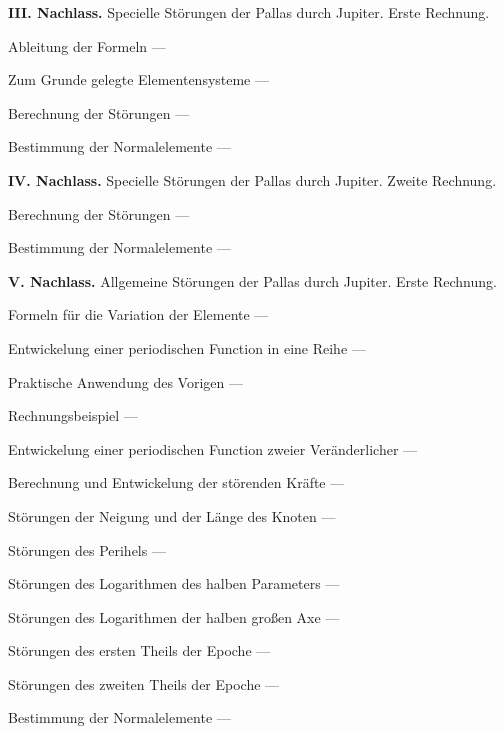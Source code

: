 \documentclass[10pt,a4paper]{article}
\newenvironment{hangparas}[2]{\setlength{\hangindent}{#1}\setlength{\hangafter}{#2}}{}
\begin{document}
\vspace{0.5em}

\begin{hangparas}{1em}{1}
\noindent\textbf{III. Nachlass.} Specielle Störungen der Pallas durch Jupiter. Erste Rechnung.

\vspace{0.2em}

\noindent\quad Ableitung der Formeln \hfill ---

\noindent\quad Zum Grunde gelegte Elementensysteme \hfill ---

\noindent\quad Berechnung der Störungen \hfill ---

\noindent\quad Bestimmung der Normalelemente \hfill ---
\end{hangparas}

\vspace{0.5em}

\begin{hangparas}{1em}{1}
\noindent\textbf{IV. Nachlass.} Specielle Störungen der Pallas durch Jupiter. Zweite Rechnung.

\vspace{0.2em}

\noindent\quad Berechnung der Störungen \hfill ---

\noindent\quad Bestimmung der Normalelemente \hfill ---
\end{hangparas}

\vspace{0.5em}

\begin{hangparas}{1em}{1}
\noindent\textbf{V. Nachlass.} Allgemeine Störungen der Pallas durch Jupiter. Erste Rechnung.

\vspace{0.2em}

\noindent\quad Formeln für die Variation der Elemente \hfill ---

\noindent\quad\quad Entwickelung einer periodischen Function in eine Reihe \hfill ---

\noindent\quad\quad Praktische Anwendung des Vorigen \hfill ---

\noindent\quad\quad Rechnungsbeispiel \hfill ---

\noindent\quad\quad Entwickelung einer periodischen Function zweier Veränderlicher \hfill ---

\noindent\quad\quad Berechnung und Entwickelung der störenden Kräfte \hfill ---

\noindent\quad\quad Störungen der Neigung und der Länge des Knoten \hfill ---

\noindent\quad\quad Störungen des Perihels \hfill ---

\noindent\quad\quad Störungen des Logarithmen des halben Parameters \hfill ---

\noindent\quad\quad Störungen des Logarithmen der halben großen Axe \hfill ---

\noindent\quad\quad Störungen des ersten Theils der Epoche \hfill ---

\noindent\quad\quad Störungen des zweiten Theils der Epoche \hfill ---

\noindent\quad\quad Bestimmung der Normalelemente \hfill ---
\end{hangparas}
\end{document}
